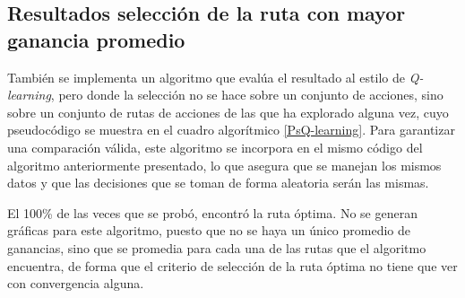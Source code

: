 \subsection{Resultados selección de la ruta con mayor ganancia promedio}

También se implementa un algoritmo que evalúa el resultado al estilo de \textit{Q-learning}, pero donde la selección no se hace sobre un conjunto de acciones, sino sobre un conjunto de rutas de acciones de las que ha explorado alguna vez, cuyo pseudocódigo se muestra en el cuadro algorítmico \ref{PsQ-learning}. Para garantizar una comparación válida, este algoritmo se incorpora en el mismo código del algoritmo anteriormente presentado, lo que asegura que se manejan los mismos datos y que las decisiones que se toman de forma aleatoria serán las mismas. 

El 100\% de las veces que se probó, encontró la ruta óptima. No se generan gráficas para este algoritmo, puesto que no se haya un único promedio de ganancias, sino que se promedia para cada una de las rutas que el algoritmo encuentra, de forma que el criterio de selección de la ruta óptima no tiene que ver con convergencia alguna.





